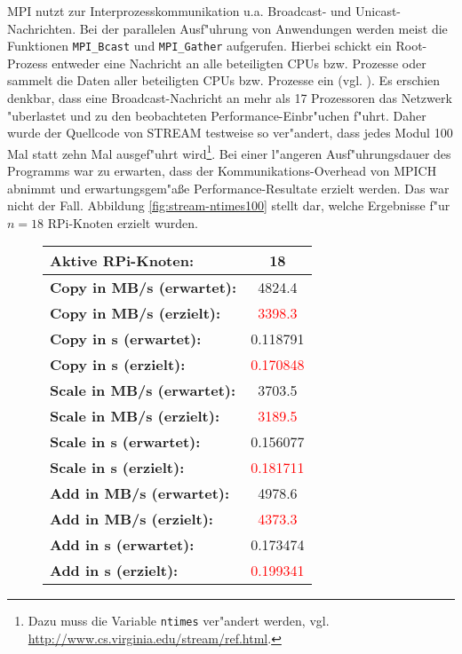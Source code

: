 \begin{enumerate}
MPI nutzt zur Interprozesskommunikation u.a. Broadcast- und Unicast-Nachrichten. Bei der parallelen Ausf"uhrung von Anwendungen werden meist die Funktionen \texttt{MPI\_Bcast} und \texttt{MPI\_Gather} aufgerufen. Hierbei schickt ein Root-Prozess entweder eine Nachricht an alle beteiligten CPUs bzw. Prozesse oder sammelt die Daten aller beteiligten CPUs bzw. Prozesse ein (vgl. \cite{pie12}). Es erschien denkbar, dass eine Broadcast-Nachricht an mehr als 17 Prozessoren das Netzwerk "uberlastet und zu den beobachteten Performance-Einbr"uchen f"uhrt. Daher wurde der Quellcode von STREAM testweise so ver"andert, dass jedes Modul 100 Mal statt zehn Mal ausgef"uhrt wird\footnote{Dazu muss die Variable \texttt{ntimes} ver"andert werden, vgl. \url{http://www.cs.virginia.edu/stream/ref.html}.}. Bei einer l"angeren Ausf"uhrungsdauer des Programms war zu erwarten, dass der Kommunikations-Overhead von MPICH abnimmt und erwartungsgem"a\ss e Performance-Resultate erzielt werden. Das war nicht der Fall. Abbildung \ref{fig:stream-ntimes100} stellt dar, welche Ergebnisse f"ur $n=18$ RPi-Knoten erzielt wurden. 
\begin{figure}[H]
  \centering
  \begin{tabular}{|l|c|}
    \hline 
    \textbf{Aktive RPi-Knoten:} & \textbf{18}\\ 
    \hline 
    \textbf{Copy in MB/s (erwartet):} & 4824.4\\
    \hline 
    \textbf{Copy in MB/s (erzielt):} & \textcolor{red}{3398.3}\\
    \hline 
    \textbf{Copy in s (erwartet):} & 0.118791\\
    \hline 
    \textbf{Copy in s (erzielt):} & \textcolor{red}{0.170848}\\
    \hline 
    \textbf{Scale in MB/s (erwartet):} & 3703.5\\
    \hline 
    \textbf{Scale in MB/s (erzielt):} & \textcolor{red}{3189.5}\\
    \hline 
	\textbf{Scale in s (erwartet):} & 0.156077\\
    \hline 
    \textbf{Scale in s (erzielt):} & \textcolor{red}{0.181711}\\
    \hline 
    \textbf{Add in MB/s (erwartet):} & 4978.6\\
    \hline 
    \textbf{Add in MB/s (erzielt):}& \textcolor{red}{4373.3}\\
    \hline 
    \textbf{Add in s (erwartet):} & 0.173474\\
    \hline 
    \textbf{Add in s (erzielt):} & \textcolor{red}{0.199341}\\

\end{tabular}
\end{figure}
\end{enumerate}
